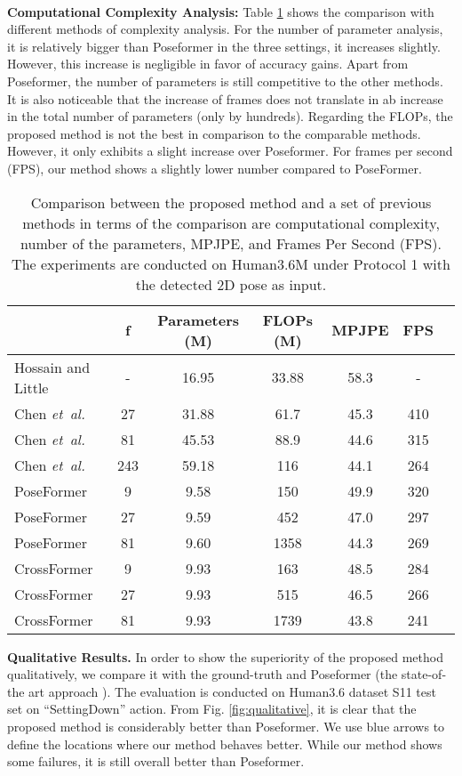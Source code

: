 \documentclass[runningheads]{llncs}
\newcommand{\latinphrase}[1]{\textit{#1}}
\newcommand{\etal}{\latinphrase{et~al.}\xspace}
\begin{document}
\\
\textbf{Computational Complexity Analysis:}  Table \ref{table:complexity} shows the comparison with different methods of complexity analysis.
For the number of parameter analysis, it is relatively bigger than Poseformer in the three settings, it increases slightly. However, this increase is negligible in favor of accuracy gains. 
Apart from Poseformer, the number of parameters is still competitive to the other methods. It is also noticeable that the increase of frames does not translate in ab increase in the total number of parameters (only by hundreds). Regarding the FLOPs, the proposed method is not the best in comparison to the comparable methods. However, it only exhibits a slight increase over Poseformer. 
For frames per second (FPS), our method shows a slightly lower number compared to PoseFormer.
\vspace{-0.5em}
\begin{table}[t!]
\centering
\caption{Comparison between the proposed method and a set of previous methods in terms of the comparison are computational complexity, number of the parameters, MPJPE, and Frames Per Second (FPS). The experiments are conducted on Human3.6M under Protocol 1 with the  detected 2D pose
as input.}
    \centering
\begin{tabular}{l|cccccc}
\hline 
 & f  & Parameters (M)  & FLOPs (M)  & MPJPE &FPS \tabularnewline
\hline 
 Hossain and Little \cite{hossain2018exploiting}& - & 16.95  & 33.88  & 58.3 & -\tabularnewline
Chen \etal \cite{chen2021anatomy}& 27  & 31.88 & 61.7  & 45.3 &410 \tabularnewline
Chen \etal \cite{chen2021anatomy}& 81  & 45.53  & 88.9  & 44.6&315 \tabularnewline
Chen \etal \cite{chen2021anatomy}& 243  & 59.18  & 116  & 44.1 &264\tabularnewline
PoseFormer \cite{poseformer}& 9  & 9.58  & 150 & 49.9 & 320 \tabularnewline
PoseFormer \cite{poseformer}& 27  & 9.59  & 452 & 47.0 & 297\tabularnewline
PoseFormer \cite{poseformer}& 81  & 9.60 & 1358  & 44.3 &269\tabularnewline
\hline 
 CrossFormer &  9&  9.93& 163 &  48.5& 284\tabularnewline
 CrossFormer &  27&  9.93& 515 &46.5  & 266\tabularnewline
 CrossFormer &  81& 9.93 &1739  & 43.8 &241 \tabularnewline
\hline 
\end{tabular}
\centering
    \label{table:complexity}
\end{table}




\textbf{Qualitative Results.} In order to show the superiority of the proposed method qualitatively, we compare it with the ground-truth and Poseformer (the state-of-the art approach \cite{poseformer}). The evaluation is conducted on Human3.6 dataset S11 test set on ``SettingDown'' action. From Fig. \ref{fig:qualitative}, it is clear that the proposed method is considerably better than Poseformer. We use blue arrows to define the locations where our method behaves better. While our method shows some failures, it is  still overall better than Poseformer.
\end{document}
